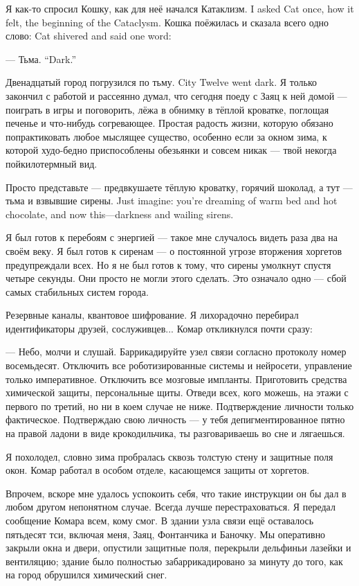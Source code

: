 {Я как-то спросил Кошку, как для неё начался Катаклизм.}
{I asked Cat once, how it felt, the beginning of the Cataclysm.}
{Кошка поёжилась и сказала всего одно слово:}
{Cat shivered and said one word:}

{--- Тьма.}
{``Dark.''}

\asterism

{Двенадцатый город погрузился по тьму.}
{City Twelve went dark.}
Я только закончил с работой и рассеянно думал, что сегодня поеду с Заяц к ней домой --- поиграть в игры и поговорить, лёжа в обнимку в тёплой кроватке, поглощая печенье и что-нибудь согревающее.
Простая радость жизни, которую обязано попрактиковать любое мыслящее существо, особенно если за окном зима, к которой худо-бедно приспособлены обезьянки и совсем никак --- твой некогда пойкилотермный вид.

{Просто представьте --- предвкушаете тёплую кроватку, горячий шоколад, а тут --- тьма и взвывшие сирены.}
{Just imagine: you're dreaming of warm bed and hot chocolate, and now this---darkness and wailing sirens.}

Я был готов к перебоям с энергией --- такое мне случалось видеть раза два на своём веку.
Я был готов к сиренам --- о постоянной угрозе вторжения хоргетов предупреждали всех.
Но я не был готов к тому, что сирены умолкнут спустя четыре секунды.
Они просто не могли этого сделать.
Это означало одно --- сбой самых стабильных систем города.

Резервные каналы, квантовое шифрование.
Я лихорадочно перебирал идентификаторы друзей, сослуживцев...
Комар откликнулся почти сразу:

--- Небо, молчи и слушай.
Баррикадируйте узел связи согласно протоколу номер восемьдесят.
Отключить все роботизированные системы и нейросети, управление только императивное.
Отключить все мозговые импланты.
Приготовить средства химической защиты, персональные щиты.
Отведи всех, кого можешь, на этажи с первого по третий, но ни в коем случае не ниже.
Подтверждение личности только фактическое.
Подтверждаю свою личность --- у тебя депигментированное пятно на правой ладони в виде крокодильчика, ты разговариваешь во сне и лягаешься.

Я похолодел, словно зима пробралась сквозь толстую стену и защитные поля окон.
Комар работал в особом отделе, касающемся защиты от хоргетов.

Впрочем, вскоре мне удалось успокоить себя, что такие инструкции он бы дал в любом другом непонятном случае.
Всегда лучше перестраховаться.
Я передал сообщение Комара всем, кому смог.
В здании узла связи ещё оставалось пятьдесят тси, включая меня, Заяц, Фонтанчика и Баночку.
Мы оперативно закрыли окна и двери, опустили защитные поля, перекрыли дельфиньи лазейки и вентиляцию;
здание было полностью забаррикадировано за минуту до того, как на город обрушился химический снег.

